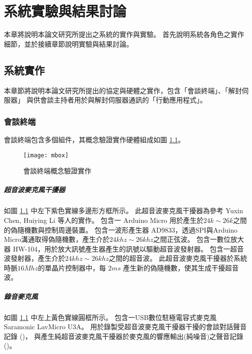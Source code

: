 \chapter{系統實驗與結果討論}

    本章將說明本論文研究所提出之系統的實作與實驗。
首先說明系統各角色之實作細節，並於接續章節說明實驗與結果討論。

\section{系統實作}

    本章節將說明本論文研究所提出的協定與硬體之實作，包含「會談終端」、「解封伺服器」
與供會談主持者用於與解封伺服器通訊的「行動應用程式」。

\subsection{會談終端}\label{subsec:impl-mbox}

    會談終端包含多個組件，其概念驗證實作硬體組成如圖 \ref{fig:mbox}。

\begin{figure}[H]
    \centering
    \texttt{[image: mbox]}
    \caption{會談終端概念驗證實作}\label{fig:mbox}
\end{figure}


\paragraph{超音波麥克風干擾器}

    如圖 \ref{fig:mbox} 中左下紫色實線多邊形方框所示。
此超音波麥克風干擾器為參考 Yuxin Chen,  Huiying Li 等人的實作\cite{chen2020wearable}。
包含一 Arduino Micro 用於產生於$24k\sim26k$之間的偽隨機數與控制周邊裝置。
包含一波形產生器 AD9833，透過SPI與Arduino Micro溝通取得偽隨機數，產生介於$24khz\sim26khz$之間正弦波。
包含一數位放大器 HW-104，用於放大訊號產生器產生的訊號以驅動超音波發射器。
包含一超音波發射器，產生介於$24khz\sim26khz$之間的超音波。
此超音波麥克風干擾器於系統時脈$16Mhz$的單晶片控制器中，每 $2ms$ 產生新的偽隨機數，使其生成干擾超音波。

\paragraph{錄音麥克風}

    如圖 \ref{fig:mbox} 中左上黃色實線圓框所示。
包含一USB數位駐極電容式麥克風 Saramonic LavMicro U3A。
用於錄製受超音波麥克風干擾器干擾的會談對話聲音記錄 (\DEFrecJ)，
與產生純超音波麥克風干擾器於麥克風的響應輸出(純噪音)之聲音記錄 (\DEFrecN)。


